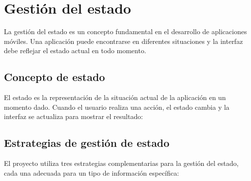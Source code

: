 
\section{Gesti\'on del estado}

La gesti\'on del estado es un concepto fundamental en el desarrollo de
aplicaciones m\'oviles. Una aplicaci\'on puede encontrarse en diferentes
situaciones y la interfaz debe reflejar el estado actual en todo momento.

\subsection{Concepto de estado}

El estado es la representaci\'on de la situaci\'on actual de la aplicaci\'on en
un momento dado. Cuando el usuario realiza una acci\'on, el estado cambia y
la interfaz se actualiza para mostrar el resultado:

\begin{center}
\end{center}

\subsection{Estrategias de gesti\'on de estado}

El proyecto utiliza tres estrategias complementarias para la gesti\'on del
estado, cada una adecuada para un tipo de informaci\'on espec\'ifica:

